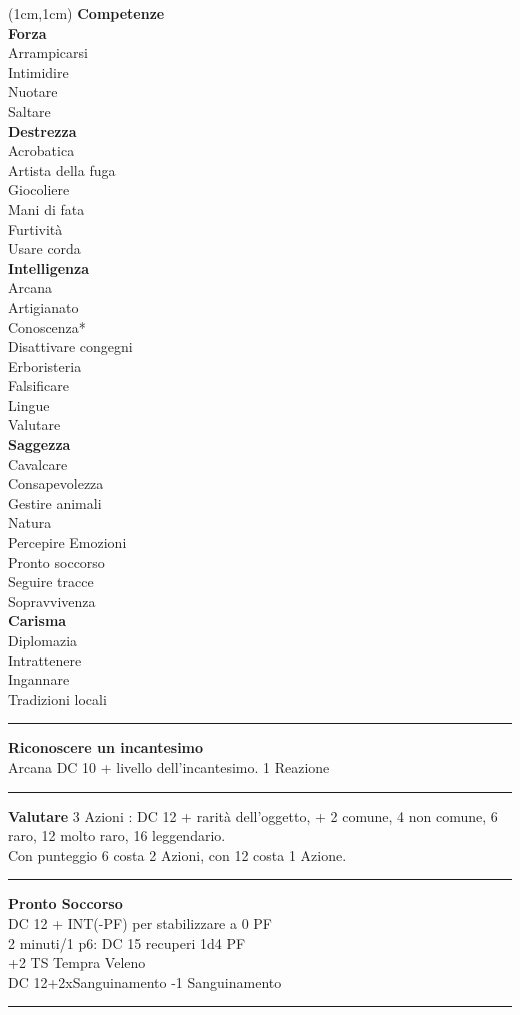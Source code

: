 \documentclass[a4paper,12 pt,openany]{book}
\newcommand{\riga}{\rule{\textwidth}{0.4pt}}
\begin{document}
\begin{textblock*}{4cm}(1cm,1cm) %
{\textbf{Competenze}\\
\textbf{Forza}\\
Arrampicarsi\\
Intimidire\\
Nuotare\\
Saltare	\\
\textbf{Destrezza}\\
Acrobatica\\
Artista della fuga\\
Giocoliere\\
Mani di fata\\
Furtività\\
Usare corda	\\
\textbf{Intelligenza}\\
Arcana\\
Artigianato\\
Conoscenza*\\
Disattivare congegni\\
Erboristeria\\
Falsificare\\
Lingue\\
Valutare\\
\textbf{Saggezza}\\
Cavalcare\\
Consapevolezza\\
Gestire animali\\
Natura\\
Percepire Emozioni\\
Pronto soccorso\\
Seguire tracce\\
Sopravvivenza\\
\textbf{Carisma}\\
Diplomazia\\
Intrattenere\\
Ingannare\\
Tradizioni locali
}

\riga

\textbf{Riconoscere un incantesimo}\\ Arcana DC 10 + livello dell'incantesimo. 1 Reazione

\riga

\textbf{Valutare} 3 Azioni : DC 12 + rarità dell'oggetto, + 2 comune, 4 non comune, 6 raro, 12 molto raro, 16 leggendario. \\
Con punteggio 6 costa 2 Azioni, con 12 costa 1 Azione.

\riga

\textbf{Pronto Soccorso}\\
DC 12 + INT(-PF) per stabilizzare a 0 PF\\
2 minuti/1 p6: DC 15 recuperi 1d4 PF\\
+2 TS Tempra Veleno\\
DC 12+2xSanguinamento -1 Sanguinamento
	
\riga

\end{textblock*}
\end{document}
